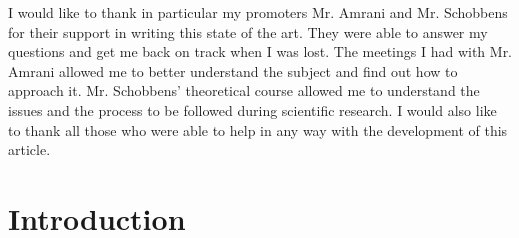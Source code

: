 \documentclass[11pt]{article}
\begin{document}

\begin{acknowledgements}
I would like to thank in particular my promoters Mr. Amrani and Mr. Schobbens for their support in writing this state of the art. They were able to answer my questions and get me back on track when I was lost. The meetings I had with Mr. Amrani allowed me to better understand the subject and find out how to approach it. Mr. Schobbens' theoretical course allowed me to understand the issues and the process to be followed during scientific research. I would also like to thank all those who were able to help in any way with the development of this article. 
\end{acknowledgements}
\newpage
\tableofcontents
\newpage

\section{Introduction}
\end{document}
